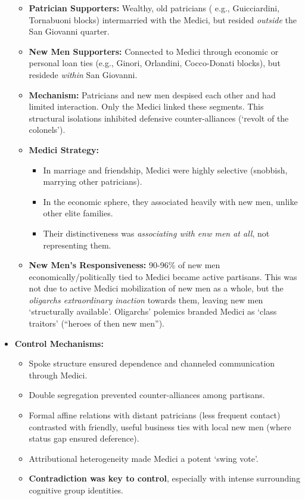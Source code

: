 \documentclass{article}
\begin{document}
\begin{itemize}
\begin{itemize}
            \item \textbf{Patrician Supporters:} Wealthy, old patricians (
            e.g., Guicciardini, Tornabuoni blocks) intermarried with the
            Medici, but resided \textit{outside} the San Giovanni quarter.
            \item \textbf{New Men Supporters:} Connected to Medici through
            economic or personal loan ties (e.g., Ginori, Orlandini,
            Cocco-Donati blocks), but residede \textit{within} San Giovanni.
            \item \textbf{Mechanism:} Patricians and new men despised each
            other and had limited interaction. Only the Medici linked these
            segments. This structural isolations inhibited defensive
            counter-alliances (`revolt of the colonels').
            \item \textbf{Medici Strategy:}
            \begin{itemize}
                \item In marriage and friendship, Medici were highly
                selective (snobbish, marrying other patricians).
                \item In the economic sphere, they associated heavily with
                new men, unlike other elite families.
                \item Their distinctiveness was
                \textit{associating with enw men at all}, not representing them.
            \end{itemize}
            \item \textbf{New Men's Responsiveness:} 90-96\% of new men
            economically/politically tied to Medici became active partisans.
            This was not due to active Medici mobilization of new men as a
            whole, but the \textit{oligarchs extraordinary inaction} towards
            them, leaving new men `structurally available'. Oligarchs'
            polemics branded Medici as `class traitors' (``heroes of then
            new men'').
        \end{itemize}
        \item \textbf{Control Mechanisms:}
        \begin{itemize}
            \item Spoke structure ensured dependence and channeled
            communication through Medici.
            \item Double segregation prevented counter-alliances among
            partisans.
            \item Formal affine relations with distant patricians (less
            frequent contact) contrasted with friendly, useful business ties
            with local new men (where status gap ensured deference).
            \item Attributional heterogeneity made Medici a potent `swing vote'.
            \item \textbf{Contradiction was key to control}, especially with
            intense surrounding cognitive group identities.
        \end{itemize}
    \end{itemize}
\end{document}
